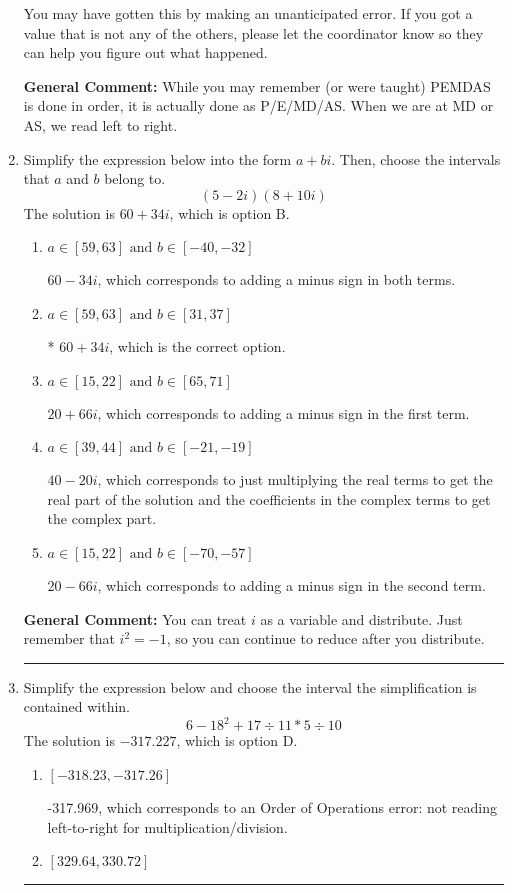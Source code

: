 \documentclass{extbook}[14pt]
\newcommand{\litem}[1]{\item #1

\rule{\textwidth}{0.4pt}}
\begin{document}
\begin{enumerate}
{\begin{enumerate}[label=\Alph*.]
 You may have gotten this by making an unanticipated error. If you got a value that is not any of the others, please let the coordinator know so they can help you figure out what happened.
\end{enumerate}

\textbf{General Comment:} While you may remember (or were taught) PEMDAS is done in order, it is actually done as P/E/MD/AS. When we are at MD or AS, we read left to right.
}
\litem{
Simplify the expression below into the form $a+bi$. Then, choose the intervals that $a$ and $b$ belong to.
\[ (5 - 2 i)(8 + 10 i) \]The solution is \( 60 + 34 i \), which is option B.\begin{enumerate}[label=\Alph*.]
\item \( a \in [59, 63] \text{ and } b \in [-40, -32] \)

 $60 - 34 i$, which corresponds to adding a minus sign in both terms.
\item \( a \in [59, 63] \text{ and } b \in [31, 37] \)

* $60 + 34 i$, which is the correct option.
\item \( a \in [15, 22] \text{ and } b \in [65, 71] \)

 $20 + 66 i$, which corresponds to adding a minus sign in the first term.
\item \( a \in [39, 44] \text{ and } b \in [-21, -19] \)

 $40 - 20 i$, which corresponds to just multiplying the real terms to get the real part of the solution and the coefficients in the complex terms to get the complex part.
\item \( a \in [15, 22] \text{ and } b \in [-70, -57] \)

 $20 - 66 i$, which corresponds to adding a minus sign in the second term.
\end{enumerate}

\textbf{General Comment:} You can treat $i$ as a variable and distribute. Just remember that $i^2=-1$, so you can continue to reduce after you distribute.
}
\litem{
Simplify the expression below and choose the interval the simplification is contained within.
\[ 6 - 18^2 + 17 \div 11 * 5 \div 10 \]The solution is \( -317.227 \), which is option D.\begin{enumerate}[label=\Alph*.]
\item \( [-318.23, -317.26] \)

 -317.969, which corresponds to an Order of Operations error: not reading left-to-right for multiplication/division.
\item \( [329.64, 330.72] \)


\end{enumerate}}
\end{enumerate}
\end{document}

